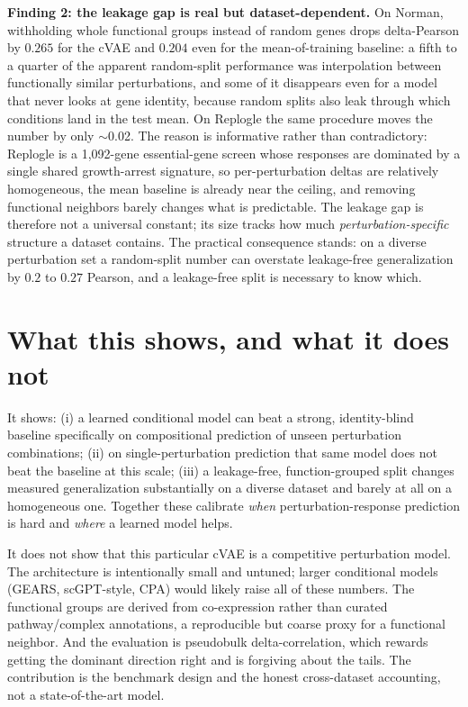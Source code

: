 \documentclass[11pt]{article}
\begin{document}
\textbf{Finding 2: the leakage gap is real but dataset-dependent.} On Norman,
withholding whole functional groups instead of random genes drops delta-Pearson
by $0.265$ for the cVAE and $0.204$ even for the mean-of-training baseline: a
fifth to a quarter of the apparent random-split performance was interpolation
between functionally similar perturbations, and some of it disappears even for a
model that never looks at gene identity, because random splits also leak through
which conditions land in the test mean. On Replogle the same procedure moves the
number by only $\sim$0.02. The reason is informative rather than contradictory:
Replogle is a 1{,}092-gene essential-gene screen whose responses are dominated by
a single shared growth-arrest signature, so per-perturbation deltas are
relatively homogeneous, the mean baseline is already near the ceiling, and
removing functional neighbors barely changes what is predictable. The leakage gap
is therefore not a universal constant; its size tracks how much
\emph{perturbation-specific} structure a dataset contains. The practical
consequence stands: on a diverse perturbation set a random-split number can
overstate leakage-free generalization by $0.2$ to $0.27$ Pearson, and a
leakage-free split is necessary to know which.

\section{What this shows, and what it does not}

It shows: (i) a learned conditional model can beat a strong, identity-blind
baseline specifically on compositional prediction of unseen perturbation
combinations; (ii) on single-perturbation prediction that same model does not beat
the baseline at this scale; (iii) a leakage-free, function-grouped split changes
measured generalization substantially on a diverse dataset and barely at all on a
homogeneous one. Together these calibrate \emph{when} perturbation-response
prediction is hard and \emph{where} a learned model helps.

It does not show that this particular cVAE is a competitive perturbation model.
The architecture is intentionally small and untuned; larger conditional models
(GEARS, scGPT-style, CPA) would likely raise all of these numbers. The functional
groups are derived from co-expression rather than curated pathway/complex
annotations, a reproducible but coarse proxy for a functional neighbor. And the
evaluation is pseudobulk delta-correlation, which rewards getting the dominant
direction right and is forgiving about the tails. The contribution is the
benchmark design and the honest cross-dataset accounting, not a state-of-the-art
model.
\end{document}
